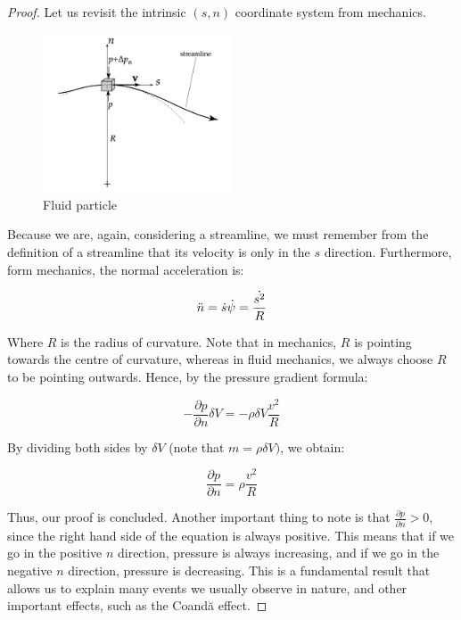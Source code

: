 \documentclass{article}
\begin{document}
\begin{proof}
    Let us revisit the intrinsic $(s, n)$ coordinate system from mechanics.

    \begin{figure}[h]
        \centering
        \includegraphics[width = 0.5\textwidth]{images/Screenshot 2024-02-20 at 17.53.25.png}
        \caption{Fluid particle}
        \label{fig:enter-label}
    \end{figure}

Because we are, again, considering a streamline, we must remember from the definition of a streamline that its velocity is only in the $s$ direction. Furthermore, form mechanics, the normal acceleration is:

\[ \Ddot{n} = \dot{s}\dot{\psi} = \frac{\dot{s^2}}{R} \]

Where $R$ is the radius of curvature. Note that in mechanics, $R$ is pointing towards the centre of curvature, whereas in fluid mechanics, we always choose $R$ to be pointing outwards. Hence, by the pressure gradient formula:

\[ -\frac{\partial p}{\partial n}\delta V = - \rho \delta V \frac{v^2}{R} \]

By dividing both sides by $\delta V$ (note that $m = \rho \delta V)$, we obtain:

\[ \frac{\partial p}{\partial n} = \rho \frac{v^2}{R} \]

Thus, our proof is concluded. Another important thing to note is that $\frac{\partial p}{\partial n} > 0$, since the right hand side of the equation is always positive. This means that if we go in the positive $n$ direction, pressure is always increasing, and if we go in the negative $n$ direction, pressure is decreasing. This is a fundamental result that allows us to explain many events we usually observe in nature, and other important effects, such as the Coandă effect.

\end{proof}
\end{document}
